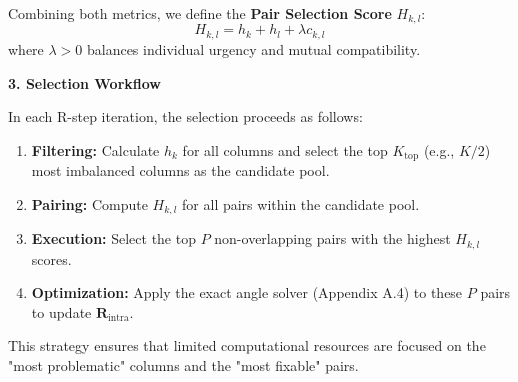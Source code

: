 Combining both metrics, we define the \textbf{Pair Selection Score} $H_{k,l}$:
\begin{equation}
H_{k,l} = h_k + h_l + \lambda c_{k,l}
\end{equation}
where $\lambda > 0$ balances individual urgency and mutual compatibility.

\textbf{3. Selection Workflow}

In each R-step iteration, the selection proceeds as follows:
\begin{enumerate}
    \item \textbf{Filtering:} Calculate $h_k$ for all columns and select the top $K_{\text{top}}$ (e.g., $K/2$) most imbalanced columns as the candidate pool.
    \item \textbf{Pairing:} Compute $H_{k,l}$ for all pairs within the candidate pool.
    \item \textbf{Execution:} Select the top $P$ non-overlapping pairs with the highest $H_{k,l}$ scores.
    \item \textbf{Optimization:} Apply the exact angle solver (Appendix A.4) to these $P$ pairs to update $\mathbf{R}_{\text{intra}}$.
\end{enumerate}
This strategy ensures that limited computational resources are focused on the "most problematic" columns and the "most fixable" pairs.